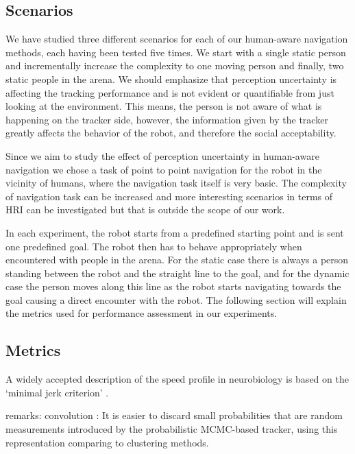 \subsection{Scenarios}
\label{sec:scenarios}

We have studied three different scenarios for each of our human-aware navigation methods, each having been tested five times. We start with a single static person and incrementally increase the complexity to one moving person and finally, two static people in the arena. We should emphasize that perception uncertainty is affecting the tracking performance and is not evident or quantifiable from just looking at the environment. This means, the person is not aware of what is happening on the tracker side, however, the information given by the tracker greatly affects the behavior of the robot, and therefore the social acceptability. 


Since we aim to study the effect of perception uncertainty in human-aware navigation we chose a task of point to point navigation for the robot in the vicinity of humans, where the navigation task itself is very basic. The complexity of navigation task can be increased and more interesting scenarios in terms of HRI can be investigated but that is outside the scope of our work. 

In each experiment, the robot starts from a predefined starting point and is sent one predefined goal. The robot then has to behave appropriately when encountered with people in the arena. For the static case there is always a person standing between the robot and the straight line to the goal, and for the dynamic case the person moves along this line as the robot starts navigating towards the goal causing a direct encounter with the robot. The following section will explain the metrics used for performance assessment in our experiments.

%




\subsection{Metrics}
A widely accepted description of the speed profile in neurobiology is based on the ‘minimal jerk criterion’ \cite{burdet1998quantization}.



remarks:
convolution : It is easier to discard small probabilities that are random measurements introduced by the probabilistic MCMC-based tracker, using this representation comparing to clustering methods.
